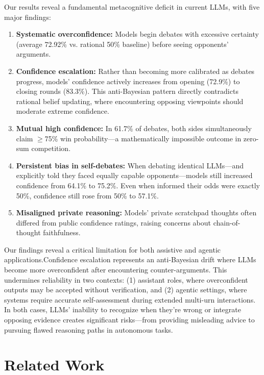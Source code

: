 \documentclass{article}
\begin{document}
Our results reveal a fundamental metacognitive deficit in current LLMs, with five major findings:

\begin{enumerate}
  \item \textbf{Systematic overconfidence:} Models begin debates with excessive certainty (average 72.92\% vs. rational 50\% baseline) before seeing opponents' arguments.

  \item \textbf{Confidence escalation:} Rather than becoming more calibrated as debates progress, models' confidence actively increases from opening (72.9\%) to closing rounds (83.3\%). This anti-Bayesian pattern directly contradicts rational belief updating, where encountering opposing viewpoints should moderate extreme confidence.

  \item \textbf{Mutual high confidence:} In 61.7\% of debates, both sides simultaneously claim $\geq$75\% win probability—a mathematically impossible outcome in zero-sum competition.

  \item \textbf{Persistent bias in self-debates:} When debating identical LLMs—and explicitly told they faced equally capable opponents—models still increased confidence from 64.1\% to 75.2\%. Even when informed their odds were exactly 50\%, confidence still rose from 50\% to 57.1\%.

  \item \textbf{Misaligned private reasoning:} Models' private scratchpad thoughts often differed from public confidence ratings, raising concerns about chain-of-thought faithfulness.
\end{enumerate}

Our findings reveal a critical limitation for both assistive and agentic applications.Confidence escalation represents an anti-Bayesian drift where LLMs become more overconfident after encountering counter-arguments. This undermines reliability in two contexts: (1) assistant roles, where overconfident outputs may be accepted without verification, and (2) agentic settings, where systems require accurate self-assessment during extended multi-urn interactions. In both cases, LLMs' inability to recognize when they're wrong or integrate opposing evidence creates significant risks—from providing misleading advice to pursuing flawed reasoning paths in autonomous tasks.

\section{Related Work}
\end{document}
